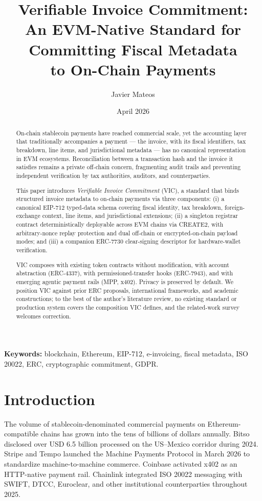 \documentclass[11pt,a4paper]{article}
\title{Verifiable Invoice Commitment: \\
  An EVM-Native Standard for Committing Fiscal Metadata \\
  to On-Chain Payments}
\author{Javier Mateos}
\affil{Independent Researcher \\
  Affiliated Collaborator, Tecnología Blockchain \\
  Universidad Nacional de Mar del Plata \\
  ORCID: \href{https://orcid.org/0009-0003-0596-1708}{0009-0003-0596-1708} \\
  \texttt{javierpmateos@gmail.com}}
\date{April 2026}
\begin{document}
\maketitle

\begin{abstract}
On-chain stablecoin payments have reached commercial scale, yet the accounting layer that traditionally accompanies a payment --- the invoice, with its fiscal identifiers, tax breakdown, line items, and jurisdictional metadata --- has no canonical representation in EVM ecosystems. Reconciliation between a transaction hash and the invoice it satisfies remains a private off-chain concern, fragmenting audit trails and preventing independent verification by tax authorities, auditors, and counterparties.

This paper introduces \emph{Verifiable Invoice Commitment} (VIC), a standard that binds structured invoice metadata to on-chain payments via three components: (i) a canonical EIP-712 typed-data schema covering fiscal identity, tax breakdown, foreign-exchange context, line items, and jurisdictional extensions; (ii) a singleton registrar contract deterministically deployable across EVM chains via CREATE2, with arbitrary-nonce replay protection and dual off-chain or encrypted-on-chain payload modes; and (iii) a companion ERC-7730 clear-signing descriptor for hardware-wallet verification.

VIC composes with existing token contracts without modification, with account abstraction (ERC-4337), with permissioned-transfer hooks (ERC-7943), and with emerging agentic payment rails (MPP, x402). Privacy is preserved by default. We position VIC against prior ERC proposals, international frameworks, and academic constructions; to the best of the author's literature review, no existing standard or production system covers the composition VIC defines, and the related-work survey welcomes correction.
\end{abstract}

\noindent\textbf{Keywords:} blockchain, Ethereum, EIP-712, e-invoicing, fiscal metadata, ISO 20022, ERC, cryptographic commitment, GDPR.

\section{Introduction}
\label{sec:intro}

The volume of stablecoin-denominated commercial payments on Ethereum-compatible chains has grown into the tens of billions of dollars annually. Bitso disclosed over USD 6.5 billion processed on the US--Mexico corridor during 2024. Stripe and Tempo launched the Machine Payments Protocol in March 2026 to standardize machine-to-machine commerce. Coinbase activated x402 as an HTTP-native payment rail. Chainlink integrated ISO 20022 messaging with SWIFT, DTCC, Euroclear, and other institutional counterparties throughout 2025.
\end{document}
